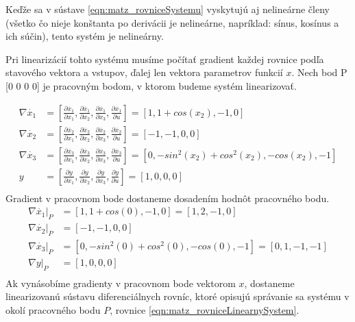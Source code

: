 \documentclass[../main.tex]{subfiles}
\begin{document}
Keďže sa v sústave \ref{eqn:matz_rovniceSystemu} vyskytujú aj nelineárne členy (všetko čo nieje konštanta po derivácii je nelineárne, napríklad: sínus, kosínus a ich súčin), tento systém je nelineárny. 

Pri linearizácií tohto systému musíme počítať gradient každej rovnice podľa stavového vektora a vstupov, ďalej len vektora parametrov funkcií $x$. Nech bod P [0 0 0 0] je pracovným bodom, v ktorom budeme systém linearizovať.

\begin{equation}
		\begin{aligned}
		\nabla{\dot{x_1}} &= [\frac{\partial{\dot{x_1}}}{\partial{x_1}},\frac{\partial{\dot{x_1}}}{\partial{x_2}},\frac{\partial{\dot{x_1}}}{\partial{x_3}},\frac{\partial{\dot{x_1}}}{\partial{u}}] = [1, 1 + cos(x_2), -1, 0]			\\
		\nabla{\dot{x_2}} &= [\frac{\partial{\dot{x_2}}}{\partial{x_1}},\frac{\partial{\dot{x_2}}}{\partial{x_2}},\frac{\partial{\dot{x_2}}}{\partial{x_3}},\frac{\partial{\dot{x_2}}}{\partial{u}}] = [-1, -1, 0, 0]			\\
		\nabla{\dot{x_3}} &= [\frac{\partial{\dot{x_3}}}{\partial{x_1}},\frac{\partial{\dot{x_3}}}{\partial{x_2}},\frac{\partial{\dot{x_3}}}{\partial{x_3}},\frac{\partial{\dot{x_3}}}{\partial{u}}] = [0, -sin^2(x_2)+cos^2(x_2), -cos(x_2), -1]			\\
		y &= [\frac{\partial{y}}{\partial{x_1}},\frac{\partial{y}}{\partial{x_2}},\frac{\partial{y}}{\partial{x_3}},\frac{\partial{y}}{\partial{u}}] = [1, 0, 0, 0]			\\
		\end{aligned}
		\label{eqn:matz_rovniceSystemuGradient}
\end{equation}
Gradient v pracovnom bode dostaneme dosadením hodnôt pracovného bodu.
\begin{equation}
		\begin{aligned}
		\nabla{\dot{x_1}}|_{P} &= [1, 1 + cos(0), -1, 0] = [1, 2, -1, 0]			\\
		\nabla{\dot{x_2}}|_{P} &= [-1, -1, 0, 0] \\
		\nabla{\dot{x_3}}|_{P} &= [0, -sin^2(0)+cos^2(0), -cos(0), -1] = [0,1, -1, -1]			\\
		\nabla{y}|_{P} &= [1, 0, 0, 0]			\\
		\end{aligned}
		\label{eqn:matz_rovniceSystemuGradient}
\end{equation}
Ak vynásobíme gradienty v pracovnom bode vektorom $x$, dostaneme linearizovanú sústavu diferenciálnych rovníc, ktoré opisujú správanie sa systému v okolí pracovného bodu $P$, rovnice \ref{eqn:matz_rovniceLinearnySystem}.
\end{document}
